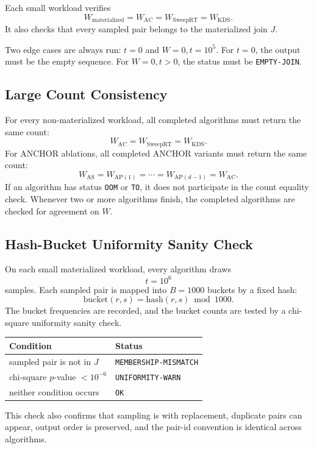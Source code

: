 \documentclass[11pt]{article}
\newcommand{\ANCHOR}{\textsc{ANCHOR}}
\newcommand{\status}[1]{\texttt{#1}}
\begin{document}
Each small workload verifies
\[
W_{\mathrm{materialized}}
=
W_{\mathrm{AC}}
=
W_{\mathrm{SweepRT}}
=
W_{\mathrm{KDS}}.
\]
It also checks that every sampled pair belongs to the materialized join $J$.

Two edge cases are always run: $t=0$ and $W=0,t=10^5$.  For $t=0$, the output must be the empty sequence.  For $W=0,t>0$, the status must be \status{EMPTY-JOIN}.

\subsection{Large Count Consistency}
For every non-materialized workload, all completed algorithms must return the same count:
\[
W_{\mathrm{AC}}=W_{\mathrm{SweepRT}}=W_{\mathrm{KDS}}.
\]
For \ANCHOR{} ablations, all completed \ANCHOR{} variants must return the same count:
\[
W_{\mathrm{AS}}=W_{\mathrm{AP}(1)}=\cdots=W_{\mathrm{AP}(d-1)}=W_{\mathrm{AC}}.
\]
If an algorithm has status \status{OOM} or \status{TO}, it does not participate in the count equality check.  Whenever two or more algorithms finish, the completed algorithms are checked for agreement on $W$.

\subsection{Hash-Bucket Uniformity Sanity Check}
On each small materialized workload, every algorithm draws
\[
t=10^6
\]
samples.  Each sampled pair is mapped into $B=1000$ buckets by a fixed hash:
\[
\mathrm{bucket}(r,s)=\mathrm{hash}(r,s)\bmod 1000.
\]
The bucket frequencies are recorded, and the bucket counts are tested by a chi-square uniformity sanity check.

\begin{center}
\begin{tabularx}{\linewidth}{@{}lY@{}}
\toprule
Condition & Status \\
\midrule
sampled pair is not in $J$ & \status{MEMBERSHIP-MISMATCH} \\
chi-square $p$-value $<10^{-6}$ & \status{UNIFORMITY-WARN} \\
neither condition occurs & \status{OK} \\
\bottomrule
\end{tabularx}
\end{center}

This check also confirms that sampling is with replacement, duplicate pairs can appear, output order is preserved, and the pair-id convention is identical across algorithms.
\end{document}
